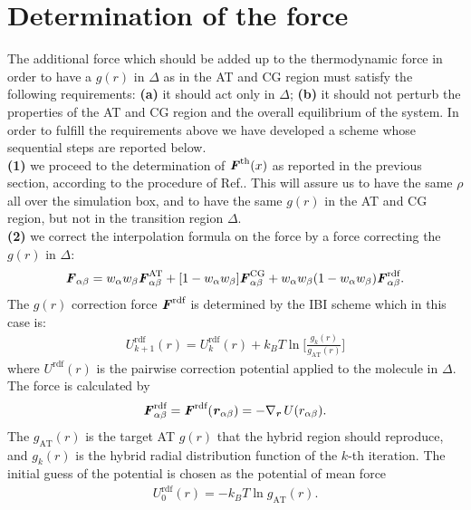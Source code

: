 \documentclass[aps,pre,preprint]{revtex4}
\renewcommand{\v}[1]{\textbf{\textit{#1}}}
\begin{document}
\section{Determination of the force}
The additional force which should be added up to the thermodynamic force in order to have a $g(r)$ in $\Delta$ as in the AT and CG region must satisfy the following requirements: {\bf (a)} it should act only in $\Delta$; {\bf (b)} it should not perturb the properties of the AT and CG region and the overall equilibrium of the system. In order to fulfill the requirements  above we have developed a scheme whose sequential steps are reported below.\\
{\bf (1)} we proceed to the determination of ${\v F}^{\textrm{th}}(x)$ as reported in the previous section, according to the procedure of Ref.\cite{prlgc}. This will assure us to have the same $\rho$ all over the simulation box, and to have the same $g(r)$ in the AT and CG region, but not in the transition region $\Delta$.\\
{\bf (2)} we correct the interpolation formula on the force by a force correcting the $g(r)$ in $\Delta$:
\begin{align}
  \v F_{\alpha\beta} = w_\alpha w_\beta\v F^{\textrm{AT}}_{\alpha\beta} + [1-w_\alpha w_\beta]\v F^{\textrm{CG}}_{\alpha\beta} + w_\alpha w_\beta (1-w_\alpha w_\beta)\v F_{\alpha\beta}^{\textrm{rdf}}.
\label{grf}
\end{align}
The $g(r)$ correction force $\v F^{\textrm{rdf}}$ is determined by the IBI scheme which in this case is: 
\begin{align}\label{eqn:ibi}
  U^{\textrm{rdf}}_{k+1}(r) = U^{\textrm{rdf}}_k(r) +
  k_B T\ln\bigg[
  \frac{g_k(r)}{g_{\textrm{AT}}(r)}
  \bigg]
\end{align}
where $U^{\textrm{rdf}}(r)$ is the pairwise correction potential
applied to the molecule in $\Delta$. The force is
calculated by
\begin{align}
  \v F^{\textrm{rdf}}_{\alpha\beta} = \v F^{\textrm{rdf}}(\v r_{\alpha\beta})
  = -\nabla_{\v r}\,U(r_{\alpha\beta}).
\end{align}
The $g_{\textrm{AT}}(r)$ is the target AT $g(r)$ that the hybrid
region should reproduce, and $g_k(r)$ is the hybrid radial distribution function of the $k$-th
iteration.  The initial guess of the potential is chosen as the
potential of mean force
\begin{align}\label{eqn:pmf}
  U^{\textrm{rdf}}_0(r) = -k_BT \ln g_{\textrm{AT}}(r).
\end{align} 
\end{document}
